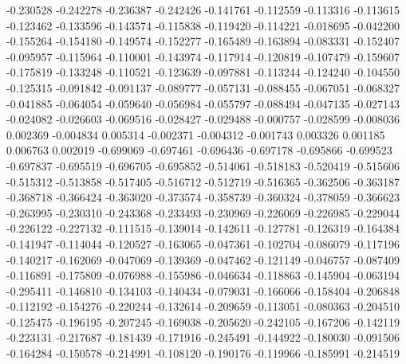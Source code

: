 -0.230528
-0.242278
-0.236387
-0.242426
-0.141761
-0.112559
-0.113316
-0.113615
-0.123462
-0.133596
-0.143574
-0.115838
-0.119420
-0.114221
-0.018695
-0.042200
-0.155264
-0.154180
-0.149574
-0.152277
-0.165489
-0.163894
-0.083331
-0.152407
-0.095957
-0.115964
-0.110001
-0.143974
-0.117914
-0.120819
-0.107479
-0.159607
-0.175819
-0.133248
-0.110521
-0.123639
-0.097881
-0.113244
-0.124240
-0.104550
-0.125315
-0.091842
-0.091137
-0.089777
-0.057131
-0.088455
-0.067051
-0.068327
-0.041885
-0.064054
-0.059640
-0.056984
-0.055797
-0.088494
-0.047135
-0.027143
-0.024082
-0.026603
-0.069516
-0.028427
-0.029488
-0.000757
-0.028599
-0.008036
0.002369
-0.004834
0.005314
-0.002371
-0.004312
-0.001743
0.003326
0.001185
0.006763
0.002019
-0.699069
-0.697461
-0.696436
-0.697178
-0.695866
-0.699523
-0.697837
-0.695519
-0.696705
-0.695852
-0.514061
-0.518183
-0.520419
-0.515606
-0.515312
-0.513858
-0.517405
-0.516712
-0.512719
-0.516365
-0.362506
-0.363187
-0.368718
-0.366424
-0.363020
-0.373574
-0.358739
-0.360324
-0.378059
-0.366623
-0.263995
-0.230310
-0.243368
-0.233493
-0.230969
-0.226069
-0.226985
-0.229044
-0.226122
-0.227132
-0.111515
-0.139014
-0.142611
-0.127781
-0.126319
-0.164384
-0.141947
-0.114044
-0.120527
-0.163065
-0.047361
-0.102704
-0.086079
-0.117196
-0.140217
-0.162069
-0.047069
-0.139369
-0.047462
-0.121149
-0.046757
-0.087409
-0.116891
-0.175809
-0.076988
-0.155986
-0.046634
-0.118863
-0.145904
-0.063194
-0.295411
-0.146810
-0.134103
-0.140434
-0.079031
-0.166066
-0.158404
-0.206848
-0.112192
-0.154276
-0.220244
-0.132614
-0.209659
-0.113051
-0.080363
-0.204510
-0.125475
-0.196195
-0.207245
-0.169038
-0.205620
-0.242105
-0.167206
-0.142119
-0.223131
-0.217687
-0.181439
-0.171916
-0.245491
-0.144922
-0.180030
-0.091506
-0.164284
-0.150578
-0.214991
-0.108120
-0.190176
-0.119966
-0.185991
-0.214519
